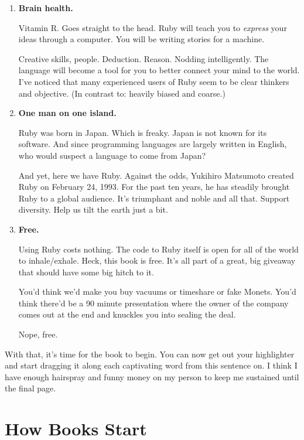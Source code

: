 \documentclass[10pt,twoside]{report}
\begin{document}
\begin{enumerate}
\item {\bf Brain health.}

Vitamin R.  Goes straight to the head.  Ruby will teach you to {\em
  express} your ideas through a computer.  You will be writing stories
for a machine.

 

Creative skills, people.  Deduction.  Reason.  Nodding
intelligently. The language will become a tool for you to better
connect your mind to the world. I've noticed that many experienced
users of Ruby seem to be clear thinkers and objective.  (In contrast
to: heavily biased and coarse.)


\item {\bf One man on one island.}

Ruby was born in Japan.  Which is freaky.  Japan is not known for its
software.  And since programming languages are largely written in
English, who would suspect a language to come from Japan?

 

And yet, here we have Ruby.  Against the odds, Yukihiro Matsumoto
created Ruby on February 24, 1993.  For the past ten years, he has
steadily brought Ruby to a global audience.  It's triumphant and noble
and all that.  Support diversity. Help us tilt the earth just a bit.


\item {\bf Free.}

Using Ruby costs nothing.  The code to Ruby itself is open for all of
the world to inhale/exhale.  Heck, this book is free.  It's all part
of a great, big giveaway that should have some big hitch to it.

 

You'd think we'd make you buy vacuums or timeshare or fake
Monets. You'd think there'd be a 90 minute presentation where the
owner of the company comes out at the end and knuckles you into
sealing the deal.

 

Nope, free.


\end{enumerate}

With that, it's time for the book to begin.  You can now get out your
highlighter and start dragging it along each captivating word from
this sentence on.  I think I have enough hairspray and funny money on
my person to keep me sustained until the final page.


\section{How Books Start}
\end{document}
